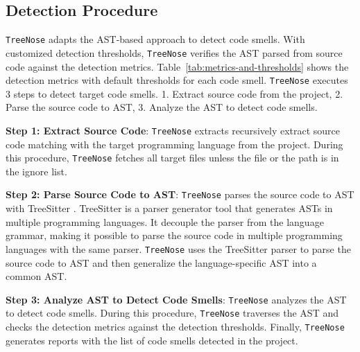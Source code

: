 \subsection{Detection Procedure}
\label{sec:Detection Procedure}

\texttt{TreeNose} adapts the AST-based approach to detect code smells. With customized detection thresholds,
\texttt{TreeNose} verifies the AST parsed from source code against the detection metrics. Table~\ref{tab:metrics-and-thresholds} shows the detection 
metrics with default thresholds for each code smell.
\texttt{TreeNose} executes 3 steps to detect target code smells. 1. Extract source code from the project, 2. Parse the source code to AST, 3. Analyze the AST to detect code smells.


\textbf{Step 1: Extract Source Code}: \texttt{TreeNose} extracts recursively extract source code matching with the target programming language from the project. During this procedure, \texttt{TreeNose} fetches
all target files unless the file or the path is in the ignore list.

\textbf{Step 2: Parse Source Code to AST}: \texttt{TreeNose} parses the source code to AST with TreeSitter \cite{treeSitter}. 
TreeSitter is a parser generator tool that generates ASTs in multiple programming languages. 
It decouple the parser from the language grammar, making it possible to parse the source code in 
multiple programming languages with the same parser. \texttt{TreeNose} uses the TreeSitter parser to parse the source code 
to AST and then generalize the language-specific AST into a common AST.

\textbf{Step 3: Analyze AST to Detect Code Smells}: \texttt{TreeNose} analyzes the AST to detect code smells. 
During this procedure, \texttt{TreeNose} traverses the AST and checks the detection metrics against the detection thresholds.
Finally, \texttt{TreeNose} generates reports with the list of code smells detected in the project.

